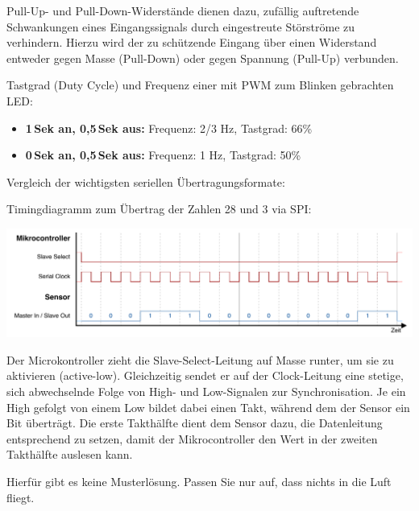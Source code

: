 \bigskip
\teilaufgabe
Pull-Up- und Pull-Down-Widerstände dienen dazu, zufällig auftretende Schwankungen
eines Eingangssignals durch eingestreute Störströme zu verhindern. Hierzu wird
der zu schützende Eingang über einen Widerstand entweder gegen Masse (Pull-Down)
oder gegen Spannung (Pull-Up) verbunden.

\bigskip
\teilaufgabe
Tastgrad (Duty Cycle) und Frequenz einer mit PWM zum Blinken gebrachten LED:

\begin{itemize}
    \item \textbf{1\,Sek an, 0,5\,Sek aus:}
    Frequenz: 2/3 Hz, Tastgrad: 66\%

    \item \textbf{0\,Sek an, 0,5\,Sek aus:}
    Frequenz: 1 Hz, Tastgrad: 50\%
\end{itemize}

\clearpage

\teilaufgabe
Vergleich der wichtigsten seriellen Übertragungsformate:


\bigskip
\teilaufgabe
Timingdiagramm zum Übertrag der Zahlen 28 und 3 via SPI:

\includegraphics[width=\textwidth]{2-hardwaredesign/img/spi_timingdiagramm}

{
    \small
    Der Microkontroller zieht die Slave-Select-Leitung auf Masse runter, um sie
    zu aktivieren (active-low). Gleichzeitig sendet er auf der Clock-Leitung eine
    stetige, sich abwechselnde Folge von High- und Low-Signalen zur Synchronisation.
    Je ein High gefolgt von einem Low bildet dabei einen Takt, während dem der
    Sensor ein Bit überträgt. Die erste Takthälfte dient dem Sensor dazu, die
    Datenleitung entsprechend zu setzen, damit der Mikrocontroller den Wert in
    der zweiten Takthälfte auslesen kann.
}

Hierfür gibt es keine Musterlösung. Passen Sie nur auf, dass nichts in die
Luft fliegt. \smiley
